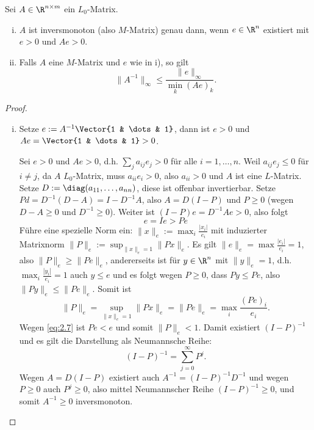 \begin{st}[$M$-Kriterium] \label{2.28}
	Sei $A \in \R^{n\times m}$ ein $L_0$-Matrix.
	\begin{enumerate}[i)]
		\item
			$A$ ist inversmonoton (also $M$-Matrix) genau dann, wenn $e \in \R^n$ existiert mit $e > 0$ und $Ae > 0$.
		\item
			Falls $A$ eine $M$-Matrix und $e$ wie in i), so gilt
			\[
				\|A^{-1}\|_{\infty} \le \frac{\|e\|_\infty}{\min_{k}(Ae)_k}.
			\]
	\end{enumerate}
	\begin{proof}
		\begin{enumerate}[i)]
			\item
				\begin{segnb}{\ProofImplication}
					Setze $e := A^{-1} \Vector{1 & \dots & 1}$, dann ist $e > 0$ und $Ae = \Vector{1 & \dots & 1} > 0$.
				\end{segnb}
				\begin{segnb}{\ProofImplication*}
					Sei $e > 0$ und $Ae > 0$, d.h. $\sum_{j} a_{ij} e_j > 0$ für alle $i = 1, \dotsc, n$.
					Weil $a_{ij} e_j \le 0$ für $i \neq j$, da $A$ $L_0$-Matrix, muss $a_{ii} e_i > 0$, also $a_{ii} > 0$ und $A$ ist eine $L$-Matrix.
					Setze $D := \diag(a_{11}, \dotsc, a_{nn})$, diese ist offenbar invertierbar.
					Setze $P d= D^{-1}(D-A) = I - D^{-1} A$, also $A = D(I-P)$ und $P \ge 0$ (wegen $D - A \ge 0$ und $D^{-1} \ge 0$).
					Weiter ist $(I-P)e = D^{-1}A e > 0$, also folgt
					\begin{equation} \label{eq:2.7}
						e = Ie > Pe
					\end{equation}
					Führe eine spezielle Norm ein: $\|x\|_e := \max_i \frac{|x_i|}{e_i}$ mit induzierter Matrixnorm $\|P\|_e := \sup_{\|x\|_e = 1} \|Px\|_e$.
					Es gilt $\|e\|_e = \max \frac{|e_i|}{e_i} = 1$, also $\|P\|_e \ge \|Pe\|_e$, andererseits ist für $y \in \R^n$ mit $\|y\|_e = 1$, d.h. $\max_i \frac{|y_i|}{e_i} = 1$ auch $y \le e$ und es folgt wegen $P \ge 0$, dass $Py \le Pe$, also $\|Py\|_e \le \|Pe\|_e$.
					Somit ist
					\[
						\|P\|_e = \sup_{\|x\|_e = 1} \|Px\|_e = \|Pe\|_e = \max_i \frac{(Pe)_i}{e_i}.
					\]
					Wegen \eqref{eq:2.7} ist $Pe < e$ und somit $\|P\|_e < 1$.
					Damit existiert $(I - P)^{-1}$ und es gilt die Darstellung als Neumannsche Reihe:
					\[
						(I - P)^{-1} = \sum_{j=0}^\infty P^j.
					\]
					Wegen $A = D(I-P)$ existiert auch $A^{-1} = (I-P)^{-1}D^{-1}$ und wegen $P \ge 0$ auch $P^j \ge 0$, also mittel Neumannscher Reihe $(I-P)^{-1} \ge 0$, und somit $A^{-1} \ge 0$ inversmonoton.

\end{segnb}
\end{enumerate}
\end{proof}
\end{st}

